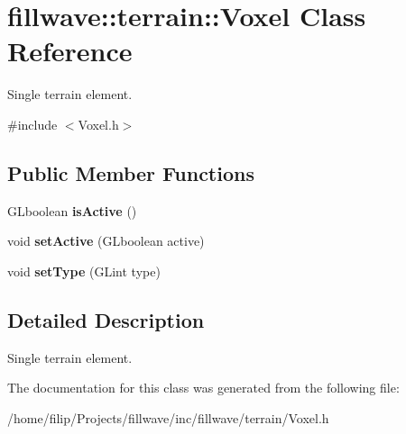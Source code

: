 \hypertarget{classfillwave_1_1terrain_1_1Voxel}{}\section{fillwave\+:\+:terrain\+:\+:Voxel Class Reference}
\label{classfillwave_1_1terrain_1_1Voxel}


Single terrain element.  




{\ttfamily \#include $<$Voxel.\+h$>$}

\subsection*{Public Member Functions}
\begin{DoxyCompactItemize}
\item 
\hypertarget{classfillwave_1_1terrain_1_1Voxel_a0741ddb6c485acc76ce9b10f3ab71a60}{}G\+Lboolean {\bfseries is\+Active} ()\label{classfillwave_1_1terrain_1_1Voxel_a0741ddb6c485acc76ce9b10f3ab71a60}

\item 
\hypertarget{classfillwave_1_1terrain_1_1Voxel_a2c0f39808ddfdf91e98697f893067da7}{}void {\bfseries set\+Active} (G\+Lboolean active)\label{classfillwave_1_1terrain_1_1Voxel_a2c0f39808ddfdf91e98697f893067da7}

\item 
\hypertarget{classfillwave_1_1terrain_1_1Voxel_ac2b4a0175e9f1b48cb749b49a111c937}{}void {\bfseries set\+Type} (G\+Lint type)\label{classfillwave_1_1terrain_1_1Voxel_ac2b4a0175e9f1b48cb749b49a111c937}

\end{DoxyCompactItemize}


\subsection{Detailed Description}
Single terrain element. 

The documentation for this class was generated from the following file\+:\begin{DoxyCompactItemize}
\item 
/home/filip/\+Projects/fillwave/inc/fillwave/terrain/Voxel.\+h\end{DoxyCompactItemize}
